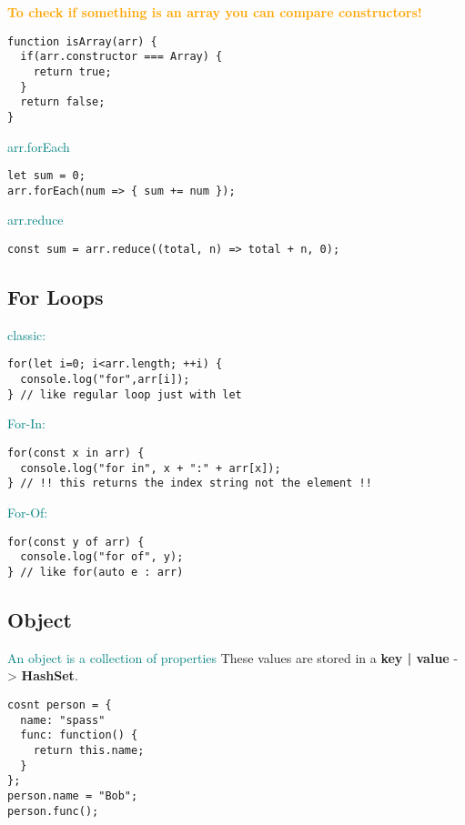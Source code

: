 \documentclass[main.tex,fontsize=6pt,paper=a4,paper=landscape,DIV=calc,]{scrartcl}
\begin{document}
\begin{multicols*}{4}
\begin{itemize}
\end{itemize}
\textcolor{orange}{\textbf{To check if something is an array you can compare constructors!}}\newline
\vspace{-2mm}
\begin{lstlisting}
function isArray(arr) {
  if(arr.constructor === Array) {
    return true;
  }
  return false;
}
\end{lstlisting}
\vspace{2mm}
\textcolor{teal}{arr.forEach}\newline
\vspace{-2mm}
\begin{lstlisting}
let sum = 0;
arr.forEach(num => { sum += num });
\end{lstlisting}
\vspace{2mm}
\textcolor{teal}{arr.reduce}\newline
\vspace{-2mm}
\begin{lstlisting}
const sum = arr.reduce((total, n) => total + n, 0);
\end{lstlisting}
\vspace{2mm}


\subsection{For Loops}  
\textcolor{teal}{classic:}
\vspace{-2mm}
\begin{lstlisting}
for(let i=0; i<arr.length; ++i) {
  console.log("for",arr[i]);
} // like regular loop just with let
\end{lstlisting}
\vspace{2mm}
\textcolor{teal}{For-In:}
\vspace{-2mm}
\begin{lstlisting}
for(const x in arr) {
  console.log("for in", x + ":" + arr[x]);
} // !! this returns the index string not the element !!
\end{lstlisting}
\vspace{2mm}
\textcolor{teal}{For-Of:}
\vspace{-2mm}
\begin{lstlisting}
for(const y of arr) {
  console.log("for of", y);
} // like for(auto e : arr)
\end{lstlisting}
\vspace{2mm}


\subsection{Object}  
\textcolor{teal}{An object is a collection of properties}\newline
These values are stored in a \textbf{key | value} -> \textbf{HashSet}.
\vspace{-2mm}
\begin{lstlisting}
cosnt person = {
  name: "spass"
  func: function() {
    return this.name;
  }
};
person.name = "Bob";
person.func();
\end{lstlisting}
\vspace{2mm}


\end{multicols*}
\end{document}
